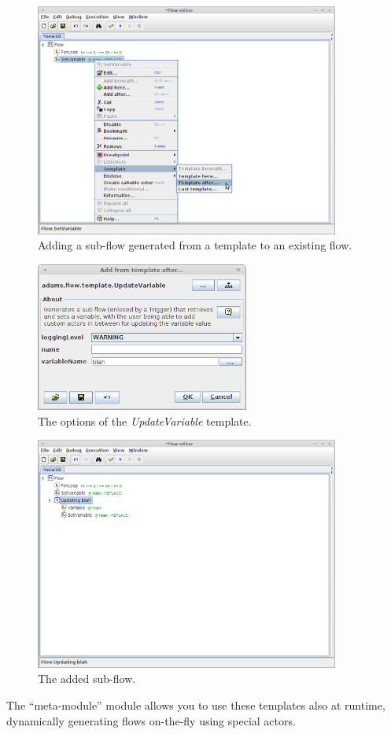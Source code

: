 \begin{figure}[htb]
  \centering
  \includegraphics[width=10.0cm]{images/template-static_use1.png}
  \caption{Adding a sub-flow generated from a template to an existing flow.}
  \label{template-static_use1}
\end{figure}

\begin{figure}[htb]
  \centering
  \includegraphics[width=7.0cm]{images/template-static_use2.png}
  \caption{The options of the \textit{UpdateVariable} template.}
  \label{template-static_use2}
\end{figure}

\begin{figure}[htb]
  \centering
  \includegraphics[width=10.0cm]{images/template-static_use3.png}
  \caption{The added sub-flow.}
  \label{template-static_use3}
\end{figure}
The ``meta-module'' module allows you to use these templates also at runtime,
dynamically generating flows on-the-fly using special actors.

